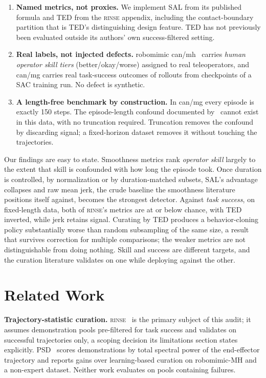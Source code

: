 \documentclass{article}
\newcommand{\rinse}{\textsc{rinse}}
\begin{document}
\begin{enumerate}
\item \textbf{Named metrics, not proxies.} We implement SAL from its
published formula and TED from the \rinse{} appendix, including the
contact-boundary partition that is TED's distinguishing design feature. TED
has not previously been evaluated outside its authors' own
success-filtered setting.
\item \textbf{Real labels, not injected defects.} robomimic
can/mh~\citep{robomimic} carries \emph{human operator skill tiers}
(better/okay/worse) assigned to real teleoperators, and can/mg carries real
task-success outcomes of rollouts from checkpoints of a SAC training run. No defect
is synthetic.
\item \textbf{A length-free benchmark by construction.} In can/mg every
episode is exactly 150 steps. The episode-length confound documented
by~\citep{bedi-policy} cannot exist in this data, with no truncation
required. Truncation removes the confound by discarding signal; a
fixed-horizon dataset removes it without touching the trajectories.
\end{enumerate}

Our findings are easy to state. Smoothness metrics rank \emph{operator
skill} largely to the extent that skill is confounded with how long the
episode took. Once duration is controlled, by normalization or by
duration-matched subsets, SAL's advantage collapses and raw mean jerk, the
crude baseline the smoothness literature positions itself against, becomes
the strongest detector. Against \emph{task success}, on fixed-length data,
both of \rinse{}'s metrics are at or below chance, with TED inverted, while
jerk retains signal. Curating by TED produces a behavior-cloning policy
substantially worse than random subsampling of the same size, a result that survives correction
for multiple comparisons; the weaker metrics are not distinguishable from
doing nothing. Skill and success are
different targets, and the curation literature validates on one while
deploying against the other.

\section{Related Work}

\textbf{Trajectory-statistic curation.} \rinse{}~\citep{rinse} is the primary
subject of this audit; it assumes demonstration pools pre-filtered for task
success and validates on successful trajectories only, a scoping decision its
limitations section states explicitly. PSD~\citep{psd} scores demonstrations
by total spectral power of the end-effector trajectory and reports gains over
learning-based curation on robomimic-MH and a non-expert dataset. Neither
work evaluates on pools containing failures.
\end{document}
